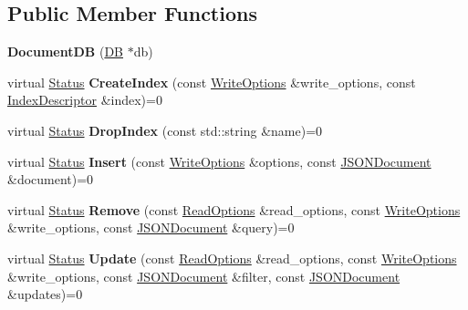 \subsection*{Public Member Functions}
\begin{DoxyCompactItemize}
\item 
{\bfseries Document\+DB} (\hyperlink{classrocksdb_1_1DB}{DB} $\ast$db)\hypertarget{classrocksdb_1_1DocumentDB_a7521c1576c8e97ac192be7a17856fe29}{}\label{classrocksdb_1_1DocumentDB_a7521c1576c8e97ac192be7a17856fe29}

\item 
virtual \hyperlink{classrocksdb_1_1Status}{Status} {\bfseries Create\+Index} (const \hyperlink{structrocksdb_1_1WriteOptions}{Write\+Options} \&write\+\_\+options, const \hyperlink{structrocksdb_1_1DocumentDB_1_1IndexDescriptor}{Index\+Descriptor} \&index)=0\hypertarget{classrocksdb_1_1DocumentDB_a3ba5420bc54b1016c62b491602ce3811}{}\label{classrocksdb_1_1DocumentDB_a3ba5420bc54b1016c62b491602ce3811}

\item 
virtual \hyperlink{classrocksdb_1_1Status}{Status} {\bfseries Drop\+Index} (const std\+::string \&name)=0\hypertarget{classrocksdb_1_1DocumentDB_a3f503331b6030566045f25bccd67209e}{}\label{classrocksdb_1_1DocumentDB_a3f503331b6030566045f25bccd67209e}

\item 
virtual \hyperlink{classrocksdb_1_1Status}{Status} {\bfseries Insert} (const \hyperlink{structrocksdb_1_1WriteOptions}{Write\+Options} \&options, const \hyperlink{classrocksdb_1_1JSONDocument}{J\+S\+O\+N\+Document} \&document)=0\hypertarget{classrocksdb_1_1DocumentDB_ac456af22d4bd0dad85476593af18a05a}{}\label{classrocksdb_1_1DocumentDB_ac456af22d4bd0dad85476593af18a05a}

\item 
virtual \hyperlink{classrocksdb_1_1Status}{Status} {\bfseries Remove} (const \hyperlink{structrocksdb_1_1ReadOptions}{Read\+Options} \&read\+\_\+options, const \hyperlink{structrocksdb_1_1WriteOptions}{Write\+Options} \&write\+\_\+options, const \hyperlink{classrocksdb_1_1JSONDocument}{J\+S\+O\+N\+Document} \&query)=0\hypertarget{classrocksdb_1_1DocumentDB_ac45f6bf1c1206f9307c106217a6fed3a}{}\label{classrocksdb_1_1DocumentDB_ac45f6bf1c1206f9307c106217a6fed3a}

\item 
virtual \hyperlink{classrocksdb_1_1Status}{Status} {\bfseries Update} (const \hyperlink{structrocksdb_1_1ReadOptions}{Read\+Options} \&read\+\_\+options, const \hyperlink{structrocksdb_1_1WriteOptions}{Write\+Options} \&write\+\_\+options, const \hyperlink{classrocksdb_1_1JSONDocument}{J\+S\+O\+N\+Document} \&filter, const \hyperlink{classrocksdb_1_1JSONDocument}{J\+S\+O\+N\+Document} \&updates)=0\hypertarget{classrocksdb_1_1DocumentDB_a433f73b4550bc683c4700b1d9c7625d5}{}\label{classrocksdb_1_1DocumentDB_a433f73b4550bc683c4700b1d9c7625d5}


\end{DoxyCompactItemize}
